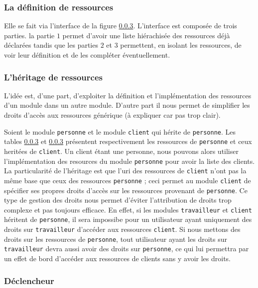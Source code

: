 \documentclass[a4paper,11pt]{report}
\begin{document}
\subsubsection{La définition de ressources}

Elle se fait via l'interface de la figure \ref{}. L'interface est
composée de trois parties. la partie $1$ permet d'avoir une liste
hiérachisée des ressources déjà déclarées tandis que les parties $2$
et $3$ permettent, en isolant les ressources, de voir leur définition et
de les compléter éventuellement.


\subsubsection{L'héritage de ressources}

L'idée est, d'une part, d'exploiter la définition et l'implémentation
des ressources d'un module dans un autre module. D'autre part il nous
permet de simplifier les droits d'accès aux ressources générique (à
expliquer car pas trop clair). 

Soient le module {\tt personne} et le module {\tt client} qui hérite
de {\tt personne}. Les tables \ref{} et \ref{} présentent
respectivement les ressources de {\tt personne} et ceux heritées de
{\tt client}. Un client étant une personne, nous pouvons alors utiliser 
l'implémentation des resources du module {\tt personne} pour avoir la 
liste des clients. La particularité de l'héritage est que l'uri des ressources
de {\tt client} n'ont pas la même base que ceux des ressources {\tt personne} ;
ceci permet  au module {\tt client} de spécifier ses propres droits d'accès 
sur les ressources provenant de {\tt personne}. Ce type de gestion des droits
nous permet d'éviter l'attribution de droits trop complexe et pas toujours efficace.
En effet, si les modules {\tt travailleur}  et {\tt client} héritent de {\tt personne},
il sera impossibe pour un utilisateur ayant uniquement des droits sur {\tt travailleur}
d'accéder aux ressources {\tt client}. Si nous mettons des droits sur les ressources
de {\tt personne}, tout utilisateur ayant les droits sur {\tt travailleur} devra aussi
avoir des droits sur {\tt personne}, ce qui lui permettra par un effet de bord d'accéder
aux ressources de clients sans y avoir les droits.


\subsubsection{Déclencheur}
\end{document}
